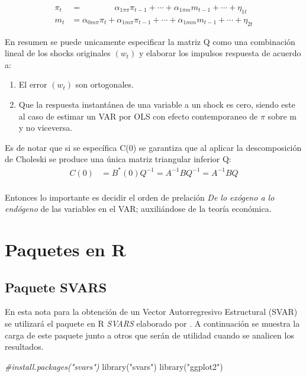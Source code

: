 \documentclass[
]{book}
\newenvironment{Shaded}{\begin{snugshade}}{\end{snugshade}}
\newcommand{\CommentTok}[1]{\textcolor[rgb]{0.56,0.35,0.01}{\textit{#1}}}
\newcommand{\FunctionTok}[1]{\textcolor[rgb]{0.00,0.00,0.00}{#1}}
\newcommand{\NormalTok}[1]{#1}
\newcommand{\StringTok}[1]{\textcolor[rgb]{0.31,0.60,0.02}{#1}}
\providecommand{\tightlist}{%
  \setlength{\itemsep}{0pt}\setlength{\parskip}{0pt}}
\begin{document}
\begin{align}
\pi_{t}&=\;\;\;\;\;\;\;\;\;\;\;\;\;\;\alpha_{1\pi \pi}\pi_{t-1}+\cdots+\alpha_{1\pi m}m_{t-1}+\cdots+\eta_{1t}\nonumber \\
m_{t}&=\alpha_{0m \pi}\pi_{t}+\alpha_{1m \pi}\pi_{t-1}+\cdots+\alpha_{1mm}m_{t-1}+\cdots +\eta_{2t}\nonumber
\end{align}

En resumen se puede unicamente especificar la matriz Q como una combinación lineal de los shocks originales \((w_{t})\) y elaborar los impulsos respuesta de acuerdo a:

\begin{enumerate}
\def\labelenumi{\arabic{enumi}.}
\tightlist
\item
  El error \((w_{t})\) son ortogonales.
\item
  Que la respuesta instantánea de una variable a un shock es cero, siendo este al caso de estimar un VAR por OLS con efecto contemporaneo de \(\pi\) sobre m y no viceversa.
\end{enumerate}

Es de notar que si se específica C(0) se garantiza que al aplicar la descomposición de Choleski se produce una única matriz triangular inferior Q:
\begin{align}
C(0)&=B^{*}(0)Q^{-1}=A^{-1}BQ^{-1}=A^{-1}BQ \nonumber\\
\end{align}

Entonces lo importante es decidir el orden de prelación \emph{De lo exógeno a lo endógeno} de las variables en el VAR; auxiliándose de la teoría económica.

\hypertarget{paquetes-en-r}{%
\chapter{Paquetes en R}\label{paquetes-en-r}}

\hypertarget{paquete-svars}{%
\section{Paquete SVARS}\label{paquete-svars}}

En esta nota para la obtención de un Vector Autorregresivo Estructural (SVAR) se utilizará el paquete en R \emph{SVARS} elaborado por \citet{SVAR21}. A continuación se muestra la carga de este paquete junto a otros que serán de utilidad cuando se analicen los resultados.

\begin{Shaded}
\begin{Highlighting}[]
\CommentTok{\#install.packages("svars")}
\FunctionTok{library}\NormalTok{(}\StringTok{"svars"}\NormalTok{)}
\FunctionTok{library}\NormalTok{(}\StringTok{"ggplot2"}\NormalTok{)}
\end{Highlighting}
\end{Shaded}
\end{document}

